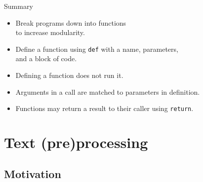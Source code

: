 \documentclass[aspectratio=169,usenames,dvipsnames]{beamer}
\begin{document}
\begin{frame}{Summary}
    \begin{itemize}
        \item Break programs down into functions \\
            to increase modularity.
        \item Define a function using \lstinline{def} with a name, parameters,\\
            and a block of code.
        \item Defining a function does not run it.
        \item Arguments in a call are matched to parameters in definition.
        \item Functions may return a result to their caller using
            \lstinline{return}.
    \end{itemize}
\end{frame}




\section{Text (pre)processing}
\subsection{Motivation}
\frame{\tableofcontents[currentsection]}

\end{document}
